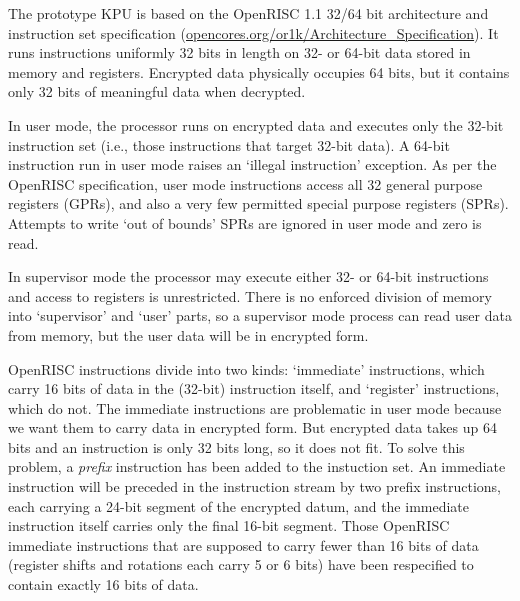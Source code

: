 \documentclass[conference]{IEEEtran}
\begin{document}
The prototype KPU is based on the OpenRISC 1.1 32/64 bit architecture
and instruction set specification
(\url{opencores.org/or1k/Architecture_Specification}).  It runs
instructions uniformly 32 bits in length on 32- or 64-bit data stored in
memory and registers.  Encrypted data physically occupies 64 bits, but
it contains only 32 bits of meaningful data when decrypted.

In user mode, the processor runs on encrypted data and executes only
the 32-bit instruction set (i.e., those instructions that target 32-bit
data).  A 64-bit instruction run in user mode raises an `illegal
instruction' exception.  As per the OpenRISC specification, user mode
instructions access all 32 general purpose registers (GPRs), and also a
very few permitted special purpose registers (SPRs).  Attempts to write
`out of bounds' SPRs are ignored in user mode and zero is read.

In supervisor mode the processor may execute either 32- or 64-bit
instructions and access to registers is unrestricted.  There is no
enforced division of memory into `supervisor' and `user' parts, so
a supervisor mode process can read user data from memory, but
the user data will be in encrypted form.

OpenRISC instructions divide into two kinds: `immediate' instructions,
which carry 16 bits of data in the (32-bit) instruction itself, and
`register' instructions, which do not.  The immediate instructions are
problematic in user mode because we want them to carry data in
encrypted form.  But encrypted data takes up 64 bits and an instruction
is only 32 bits long, so it does not fit.  To solve this problem, a {\em
prefix} instruction has been added to the instuction set.  An immediate
instruction will be preceded in the instruction stream by two prefix
instructions, each carrying a 24-bit segment of the encrypted datum, and
the immediate instruction itself carries only the final 16-bit segment.
Those OpenRISC immediate instructions that are supposed to carry fewer
than 16 bits of data (register shifts and rotations each carry 5 or 6
bits) have been respecified to contain exactly 16 bits of data.
\end{document}
